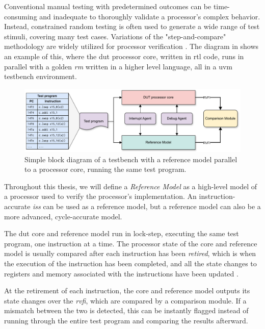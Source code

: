 Conventional manual testing with predetermined outcomes can be time\--consuming and inadequate to thoroughly validate a processor's complex behavior. Instead, constrained random testing is often used to generate a wide range of test stimuli, covering many test cases. Variations of the "step-and-compare" methodology are widely utilized for processor verification \cite{taylorAdvancedRISCVVerification2023}. The diagram in  shows an example of this, where the \acrfull{dut} processor core, written in \acrfull{rtl} code, runs in parallel with a golden \textit{\gls{rm}} written in a higher level language, all in a \acrfull{uvm} testbench environment. 

\begin{figure}
    \centering
    \includegraphics[width=1.00\linewidth]{figures/ISS_Testbench.pdf}
    \caption{Simple block diagram of a testbench with a reference model parallel to a processor core, running the same test program. }
    \label{fig:testbench_block_diagram}
\end{figure}


Throughout this thesis, we will define a \textit{Reference Model} as a high-level model of a processor used to verify the processor's implementation. An instruction\--accurate \textit{\acrfull{iss}} can be used as a reference model, but a reference model can also be a more advanced, cycle-accurate model. 

The \acrshort{dut} core and reference model run in lock-step, executing the same test program, one instruction at a time. 
The processor state of the core and reference model is usually compared after each instruction has been \textit{retired}, which is when the execution of the instruction has been completed, and all the state changes to registers and memory associated with the instructions have been updated \cite{taylorAdvancedRISCVVerification2023}. 

At the retirement of each instruction, the core and reference model outputs its state changes over the \textit{\acrfull{rvfi}}, which are compared by a comparison module. If a mismatch between the two is detected, this can be instantly flagged instead of running through the entire test program and comparing the results afterward. 


